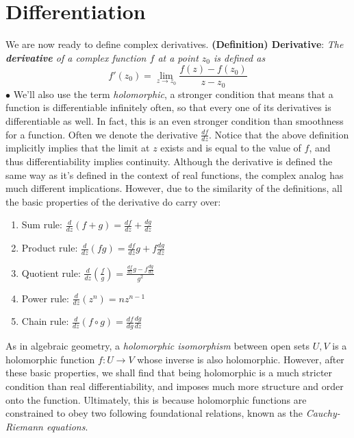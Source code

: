 \documentclass{article}
\newcommand*{\tb}{\textbf}
\newcommand*{\ti}{\textit}
\newcommand*{\nn}{\newline \newline}
\begin{document}
\section{Differentiation}
We are now ready to define complex derivatives.
\nn
\tb{(Definition) Derivative}: \ti{The \tb{derivative} of a complex function $ f $ at a point $ z_0 $ is defined as}
$$ f'(z_0) = \lim_{z \to z_0} \frac{f(z) - f(z_0)}{z - z_0} $$
\indent $ \bullet $ We'll also use the term \ti{holomorphic}, a stronger condition that means that a function is differentiable infinitely often, so that every one of its derivatives is differentiable as well. In fact, this is an even stronger condition than smoothness for a function.
\nn
Often we denote the derivative $ \frac{df}{dz} $. Notice that the above definition implicitly implies that the limit at $ z $ exists and is equal to the value of $ f $, and thus differentiability implies continuity. Although the derivative is defined the same way as it's defined in the context of real functions, the complex analog has much different implications. However, due to the similarity of the definitions, all the basic properties of the derivative do carry over:
\begin{enumerate}
    \item Sum rule: $ \frac{d}{dz} (f + g) = \frac{df}{dz} + \frac{dg}{dz} $
    \item Product rule: $ \frac{d}{dz}(f g) = \frac{df}{dz} g + f \frac{dg}{dz} $
    \item Quotient rule: $ \frac{d}{dz}\left( \frac{f}{g} \right) = \frac{\frac{df}{dz} g - f \frac{dg}{dz}}{g^2} $
    \item Power rule: $ \frac{d}{dz}(z^n) = n z^{n - 1} $
    \item Chain rule: $ \frac{d}{dz}(f \circ g) = \frac{d f}{d g} \frac{d g}{d z} $
\end{enumerate}
As in algebraic geometry, a \ti{holomorphic isomorphism} between open sets $ U, V $ is a holomorphic function $ f: U \rightarrow V $ whose inverse is also holomorphic. However, after these basic properties, we shall find that being holomorphic is a much stricter condition than real differentiability, and imposes much more structure and order onto the function. Ultimately, this is because holomorphic functions are constrained to obey two following foundational relations, known as the \ti{Cauchy-Riemann equations}.
\end{document}
